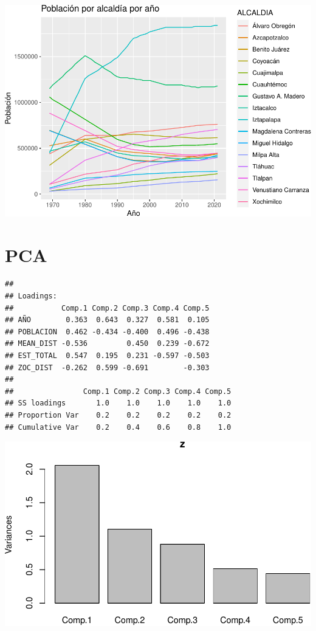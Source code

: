 \documentclass[
  spanish,
]{article}
\begin{document}
\begin{center}\includegraphics{proyecto_files/figure-latex/unnamed-chunk-14-1} \end{center}

\hypertarget{pca}{%
\section{PCA}\label{pca}}

\begin{verbatim}
## 
## Loadings:
##           Comp.1 Comp.2 Comp.3 Comp.4 Comp.5
## AÑO        0.363  0.643  0.327  0.581  0.105
## POBLACION  0.462 -0.434 -0.400  0.496 -0.438
## MEAN_DIST -0.536         0.450  0.239 -0.672
## EST_TOTAL  0.547  0.195  0.231 -0.597 -0.503
## ZOC_DIST  -0.262  0.599 -0.691        -0.303
## 
##                Comp.1 Comp.2 Comp.3 Comp.4 Comp.5
## SS loadings       1.0    1.0    1.0    1.0    1.0
## Proportion Var    0.2    0.2    0.2    0.2    0.2
## Cumulative Var    0.2    0.4    0.6    0.8    1.0
\end{verbatim}

\begin{center}\includegraphics{proyecto_files/figure-latex/unnamed-chunk-16-1} \end{center}
\end{document}
